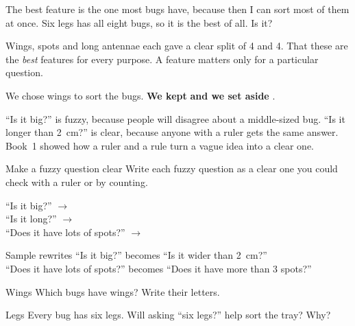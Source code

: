 \begin{multix}[hmm]\multixbot[hmm]\tcblower
The best feature is the one most bugs have, because then I can sort most of them at once. Six legs has all eight bugs, so it is the best of all. Is it?
\end{multix}

{Wings, spots and long antennae each gave a clear split of 4 and 4.}
{That these are the \emph{best} features for every purpose. A feature matters only for a particular question.}

\begin{keepbox}
We chose wings to sort the bugs. \textbf{We kept} \wline[3.4cm] \textbf{and we set aside} \wline[3.4cm].
\end{keepbox}

\clearpage

``Is it big?'' is fuzzy, because people will disagree about a middle-sized bug. ``Is it longer than 2~cm?'' is clear, because anyone with a ruler gets the same answer. Book~1 showed how a ruler and a rule turn a vague idea into a clear one.

\begin{tryit}{Make a fuzzy question clear}
Write each fuzzy question as a clear one you could check with a ruler or by counting.\par\medskip
``Is it big?'' \quad $\to$ \wline[6cm]\\[10pt]
``Is it long?'' \quad $\to$ \wline[6cm]\\[10pt]
``Does it have lots of spots?'' \quad $\to$ \wline[5cm]
\end{tryit}

\begin{worked}{Sample rewrites}
``Is it big?'' becomes ``Is it wider than 2~cm?''\\
``Does it have lots of spots?'' becomes ``Does it have more than 3 spots?''
\end{worked}

\clearpage

\begin{puzzle}{Wings}
Which bugs have wings? Write their letters. \wline[4cm]
\end{puzzle}

\begin{puzzle}{Legs}
Every bug has six legs. Will asking ``six legs?'' help sort the tray? \wline[2cm] Why? \wline[5cm]
\end{puzzle}

